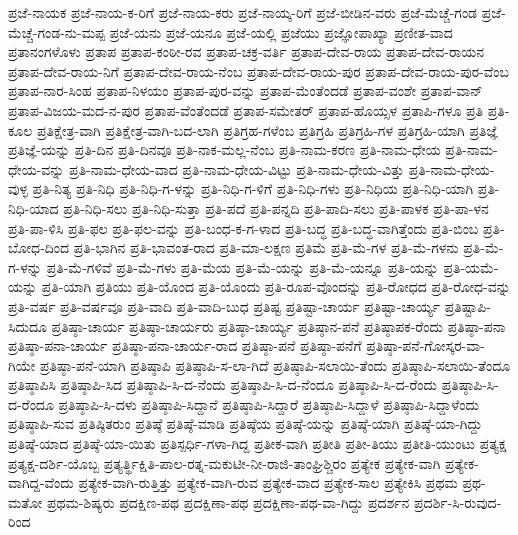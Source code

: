ಪ್ರಜೆ-ನಾಯಕ
ಪ್ರಜೆ-ನಾಯ-ಕ-ರಿಗೆ
ಪ್ರಜೆ-ನಾಯ-ಕರು
ಪ್ರಜೆ-ನಾಯ್ಕ-ರಿಗೆ
ಪ್ರಜೆ-ಬೀಡಿನ-ವರು
ಪ್ರಜೆ-ಮೆಚ್ಚೆ-ಗಂಡ
ಪ್ರಜೆ-ಮೆಚ್ಚೆ-ಗಂಡ-ನು-ಮಪ್ಪ
ಪ್ರಜೆ-ಯನು
ಪ್ರಜೆ-ಯನೂ
ಪ್ರಜೆ-ಯಲ್ಲಿ
ಪ್ರಜೆಯು
ಪ್ರಜ್ಞೋಪಾಖ್ಯಾ
ಪ್ರಣೀತ-ವಾದ
ಪ್ರತಾನಂಗಳೊಳು
ಪ್ರತಾಪ
ಪ್ರತಾಪ-ಕಂಠೀ-ರವ
ಪ್ರತಾಪ-ಚಕ್ರ-ವರ್ತಿ
ಪ್ರತಾಪ-ದೇವ-ರಾಯ
ಪ್ರತಾಪ-ದೇವ-ರಾಯನ
ಪ್ರತಾಪ-ದೇವ-ರಾಯ-ನಿಗೆ
ಪ್ರತಾಪ-ದೇವ-ರಾಯ-ನೆಂಬ
ಪ್ರತಾಪ-ದೇವ-ರಾಯ-ಪುರ
ಪ್ರತಾಪ-ದೇವ-ರಾಯ-ಪುರ-ವೆಂಬ
ಪ್ರತಾಪ-ನಾರ-ಸಿಂಹ
ಪ್ರತಾಪ-ನಿಳಯಂ
ಪ್ರತಾಪ-ಪುರ-ವನ್ನು
ಪ್ರತಾಪ-ಮೆಂತೆಂದಡೆ
ಪ್ರತಾಪ-ವಂಶೇ
ಪ್ರತಾಪ-ವಾನ್
ಪ್ರತಾಪ-ವಿಜಯ-ಮದ-ನ-ಪುರ
ಪ್ರತಾಪ-ವೆಂತೆಂದಡೆ
ಪ್ರತಾಪ-ಸಮೇತರ್
ಪ್ರತಾಪ-ಹೊಯ್ಸಳ
ಪ್ರತಾಪಿ-ಗಳೂ
ಪ್ರತಿ
ಪ್ರತಿ-ಕೂಲ
ಪ್ರತಿಕ್ಷೇತ್ರ-ವಾಗಿ
ಪ್ರತಿಕ್ಷೇತ್ರ-ವಾಗಿ-ಬದ-ಲಾಗಿ
ಪ್ರತಿಗ್ರಹ-ಗಳೆಂಬ
ಪ್ರತಿಗ್ರಹಿ
ಪ್ರತಿಗ್ರಹಿ-ಗಳ
ಪ್ರತಿಗ್ರಹಿ-ಯಾಗಿ
ಪ್ರತಿಜ್ಞೆ
ಪ್ರತಿಜ್ಞೆ-ಯನ್ನು
ಪ್ರತಿ-ದಿನ
ಪ್ರತಿ-ದಿನವೂ
ಪ್ರತಿ-ನಾಕ-ಮಲ್ಲ-ನೆಂಬ
ಪ್ರತಿ-ನಾಮ-ಕರಣ
ಪ್ರತಿ-ನಾಮ-ಧೇಯ
ಪ್ರತಿ-ನಾಮ-ಧೇಯ-ವನ್ನು
ಪ್ರತಿ-ನಾಮ-ಧೇಯ-ವಾದ
ಪ್ರತಿ-ನಾಮ-ಧೇಯ-ವಿಟ್ಟು
ಪ್ರತಿ-ನಾಮ-ಧೇಯ-ವಿತ್ತು
ಪ್ರತಿ-ನಾಮ-ಧೇಯ-ವುಳ್ಳ
ಪ್ರತಿ-ನಿತ್ಯ
ಪ್ರತಿ-ನಿಧಿ
ಪ್ರತಿ-ನಿಧಿ-ಗ-ಳನ್ನು
ಪ್ರತಿ-ನಿಧಿ-ಗ-ಳಿಗೆ
ಪ್ರತಿ-ನಿಧಿ-ಗಳು
ಪ್ರತಿ-ನಿಧಿಯ
ಪ್ರತಿ-ನಿಧಿ-ಯಾಗಿ
ಪ್ರತಿ-ನಿಧಿ-ಯಾದ
ಪ್ರತಿ-ನಿಧಿ-ಸಲು
ಪ್ರತಿ-ನಿಧಿ-ಸುತ್ತಾ
ಪ್ರತಿ-ಪದೆ
ಪ್ರತಿ-ಪನ್ನದಿ
ಪ್ರತಿ-ಪಾದಿ-ಸಲು
ಪ್ರತಿ-ಪಾಳಕ
ಪ್ರತಿ-ಪಾ-ಳನ
ಪ್ರತಿ-ಪಾ-ಳಿಸಿ
ಪ್ರತಿ-ಫಲ
ಪ್ರತಿ-ಫಲ-ವನ್ನು
ಪ್ರತಿ-ಬಂಧ-ಕ-ಗ-ಳಾದ
ಪ್ರತಿ-ಬದ್ಧ
ಪ್ರತಿ-ಬದ್ಧ-ವಾಗಿತ್ತೆಂದು
ಪ್ರತಿ-ಬಿಂಬ
ಪ್ರತಿ-ಬೋಧ-ದಿಂದ
ಪ್ರತಿ-ಭಾಗಿನ
ಪ್ರತಿ-ಭಾವಂತ-ರಾದ
ಪ್ರತಿ-ಮಾ-ಲಕ್ಷಣ
ಪ್ರತಿಮೆ
ಪ್ರತಿ-ಮೆ-ಗಳ
ಪ್ರತಿ-ಮೆ-ಗಳನು
ಪ್ರತಿ-ಮೆ-ಗ-ಳನ್ನು
ಪ್ರತಿ-ಮೆ-ಗಳಿವೆ
ಪ್ರತಿ-ಮೆ-ಗಳು
ಪ್ರತಿ-ಮೆಯ
ಪ್ರತಿ-ಮೆ-ಯನ್ನು
ಪ್ರತಿ-ಮೆ-ಯನ್ನೂ
ಪ್ರತಿ-ಯನ್ನು
ಪ್ರತಿ-ಯಮೆ-ಯನ್ನು
ಪ್ರತಿ-ಯಾಗಿ
ಪ್ರತಿಯು
ಪ್ರತಿ-ಯೊಂದ
ಪ್ರತಿ-ಯೊಂದು
ಪ್ರತಿ-ರೂಪ-ವೊಂದನ್ನು
ಪ್ರತಿ-ರೋಧದ
ಪ್ರತಿ-ರೋಧ-ವನ್ನು
ಪ್ರತಿ-ವರ್ಷ
ಪ್ರತಿ-ವರ್ಷವೂ
ಪ್ರತಿ-ವಾದಿ
ಪ್ರತಿ-ವಾದಿ-ಬುಧ
ಪ್ರತಿಷ್ಟ
ಪ್ರತಿಷ್ಟಾ-ಚಾರ್ಯ
ಪ್ರತಿಷ್ಟಾ-ಚಾರ್ಯ್ಯ
ಪ್ರತಿಷ್ಟಾಪಿ-ಸಿದುದೂ
ಪ್ರತಿಷ್ಠಾ-ಚಾರ್ಯ
ಪ್ರತಿಷ್ಠಾ-ಚಾರ್ಯರು
ಪ್ರತಿಷ್ಠಾ-ಚಾರ್ಯ್ಯ
ಪ್ರತಿಷ್ಠಾನ-ಪನೆ
ಪ್ರತಿಷ್ಠಾಪಕ-ರೆಂದು
ಪ್ರತಿಷ್ಠಾ-ಪನಾ
ಪ್ರತಿಷ್ಠಾ-ಪನಾ-ಚಾರ್ಯ
ಪ್ರತಿಷ್ಠಾ-ಪನಾ-ಚಾರ್ಯ-ರಾದ
ಪ್ರತಿಷ್ಠಾ-ಪನೆ
ಪ್ರತಿಷ್ಠಾ-ಪನೆಗೆ
ಪ್ರತಿಷ್ಠಾ-ಪನೆ-ಗೋಸ್ಕರ-ವಾ-ಗಿಯೇ
ಪ್ರತಿಷ್ಠಾ-ಪನೆ-ಯಾಗಿ
ಪ್ರತಿಷ್ಠಾಪಿ
ಪ್ರತಿಷ್ಠಾಪಿ-ಸ-ಲಾ-ಗಿದೆ
ಪ್ರತಿಷ್ಠಾಪಿ-ಸಲಾಯಿ-ತೆಂದು
ಪ್ರತಿಷ್ಠಾಪಿ-ಸಲಾಯಿ-ತೆಂದೂ
ಪ್ರತಿಷ್ಠಾಪಿಸಿ
ಪ್ರತಿಷ್ಠಾಪಿ-ಸಿದ
ಪ್ರತಿಷ್ಠಾಪಿ-ಸಿ-ದ-ನೆಂದು
ಪ್ರತಿಷ್ಠಾಪಿ-ಸಿ-ದ-ನೆಂದೂ
ಪ್ರತಿಷ್ಠಾಪಿ-ಸಿ-ದ-ರೆಂದು
ಪ್ರತಿಷ್ಠಾಪಿ-ಸಿ-ದ-ರೆಂದೂ
ಪ್ರತಿಷ್ಠಾಪಿ-ಸಿ-ದಳು
ಪ್ರತಿಷ್ಠಾಪಿ-ಸಿದ್ದಾನೆ
ಪ್ರತಿಷ್ಠಾಪಿ-ಸಿದ್ದಾರೆ
ಪ್ರತಿಷ್ಠಾಪಿ-ಸಿದ್ದಾಳೆ
ಪ್ರತಿಷ್ಠಾಪಿ-ಸಿದ್ದಾಳೆಂದು
ಪ್ರತಿಷ್ಠಾಪಿ-ಸುವ
ಪ್ರತಿಷ್ಠಿತರುಂ
ಪ್ರತಿಷ್ಠೆ
ಪ್ರತಿಷ್ಠೆ-ಮಾಡಿ
ಪ್ರತಿಷ್ಠೆಯ
ಪ್ರತಿಷ್ಠೆ-ಯನ್ನು
ಪ್ರತಿಷ್ಠೆ-ಯಾಗಿ
ಪ್ರತಿಷ್ಠೆ-ಯಾ-ಗಿದ್ದು
ಪ್ರತಿಷ್ಠೆ-ಯಾದ
ಪ್ರತಿಷ್ಠೆ-ಯಾ-ಯಿತು
ಪ್ರತಿಸ್ಪರ್ಧಿ-ಗಳಾ-ಗಿದ್ದ
ಪ್ರತೀಕ-ವಾಗಿ
ಪ್ರತೀತಿ
ಪ್ರತೀ-ತಿಯು
ಪ್ರತೀತಿ-ಯುಂಟು
ಪ್ರತ್ಯಕ್ಷ
ಪ್ರತ್ಯಕ್ಷ-ದರ್ಶಿ-ಯೊಬ್ಬ
ಪ್ರತ್ಯರ್ತ್ಥಿಕ್ಷಿತಿ-ಪಾಲ-ರತ್ನ-ಮಕುಟೀ-ನೀ-ರಾಜಿ-ತಾಂಘ್ರಿಶ್ಚಿರಂ
ಪ್ರತ್ಯೇಕ
ಪ್ರತ್ಯೇಕ-ವಾಗಿ
ಪ್ರತ್ಯೇಕ-ವಾಗಿದ್ದ-ವೆಂದು
ಪ್ರತ್ಯೇಕ-ವಾಗಿ-ರುತ್ತಿತ್ತು
ಪ್ರತ್ಯೇಕ-ವಾಗಿ-ರುವ
ಪ್ರತ್ಯೇಕ-ವಾದ
ಪ್ರತ್ಯೇಕ-ಸಾಲ
ಪ್ರತ್ಯೇಕಿಸಿ
ಪ್ರಥಮ
ಪ್ರಥ-ಮತೋ
ಪ್ರಥಮ-ಶಿಷ್ಯರು
ಪ್ರದಕ್ಷಿಣ-ಪಥ
ಪ್ರದಕ್ಷಿಣಾ-ಪಥ
ಪ್ರದಕ್ಷಿಣಾ-ಪಥ-ವಾ-ಗಿದ್ದು
ಪ್ರದರ್ಶನ
ಪ್ರದರ್ಶಿ-ಸಿ-ರುವುದ-ರಿಂದ
